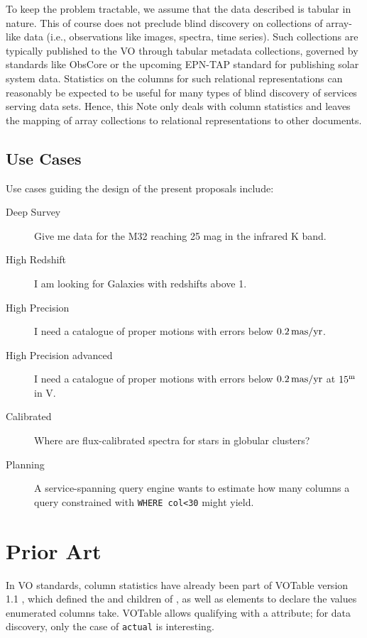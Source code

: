 \documentclass[11pt,a4paper]{ivoa}
\begin{document}
To keep the problem tractable, we assume that the data described is
tabular in nature.  This of course does not preclude blind discovery on
collections of array-like data (i.e., observations like images,
spectra, time series).  Such collections are typically published to the
VO through tabular metadata collections, governed by standards like
ObsCore \citep{2017ivoa.spec.0509L} or the upcoming EPN-TAP standard for
publishing solar system data.  Statistics on the columns for such
relational representations can reasonably be expected to be useful for
many types of blind discovery of services serving data sets.  Hence,
this Note only deals with column statistics and leaves the mapping of
array collections to relational representations to other documents.

\subsection{Use Cases}
\label{sect:uc}

Use cases guiding the design of the present proposals include:

\begin{description}
\item[Deep Survey] Give me data for the M32 reaching 25 mag in the
infrared K band.

\item[High Redshift] I am looking for Galaxies with redshifts above 1.

\item[High Precision] I need a catalogue of proper motions with errors
below $0.2\,\rm mas/yr$.

\item[High Precision advanced] I need a catalogue of proper motions with
errors below $0.2\,\rm mas/yr$ at $15^{\rm m}$ in V.

\item[Calibrated] Where are flux-calibrated spectra for stars in
globular clusters?

\item[Planning] A service-spanning query engine wants to estimate how
many columns a query constrained with \verb|WHERE col<30| might yield.
\end{description}


\section{Prior Art}

In VO standards, column statistics have already been part of
VOTable version 1.1 \citep{2004ivoa.spec.0811O}, which defined the
 and  children of , as well as
 elements to declare the values enumerated columns take.
VOTable allows qualifying  with a  attribute;
for data discovery, only the case of \verb|actual| is interesting.
\end{document}
